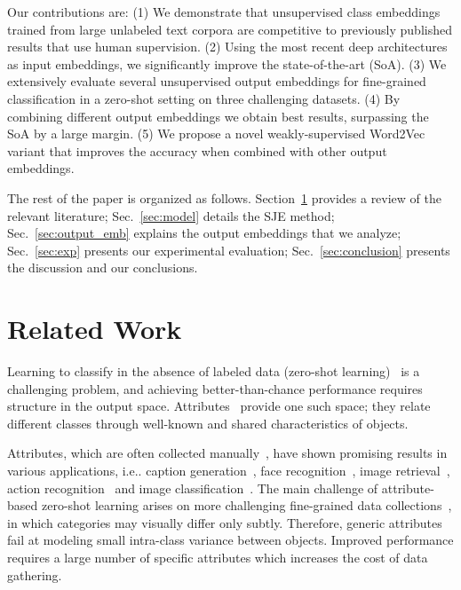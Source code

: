 \documentclass[10pt,twocolumn,letterpaper]{article}
\makeatletter
\newcommand{\SJE}{SJE\xspace}
\DeclareRobustCommand\onedot{\futurelet\@let@token\@onedot}
\def\@onedot{\ifx\@let@token.\else.\null\fi\xspace}
\def\ie{{i.e}\onedot} \def\Ie{{I.e}\onedot}
\makeatother
\begin{document}
Our contributions are: (1) We demonstrate that unsupervised class embeddings trained from large unlabeled text corpora are competitive to previously published results that use human supervision. (2) Using the most recent deep architectures as input embeddings, we significantly improve the state-of-the-art (SoA). (3) We extensively evaluate several unsupervised output embeddings for fine-grained classification in a zero-shot setting on three challenging datasets. (4) 
By combining different output embeddings we obtain best results, surpassing the SoA by a large margin. 
(5) We propose a novel weakly-supervised Word2Vec variant that improves the accuracy when combined with other output embeddings.  

The rest of the paper is organized as follows. Section~\ref{sec:prev} provides a review of the relevant literature; Sec.~\ref{sec:model} details the \SJE method; Sec.~\ref{sec:output_emb} explains the output embeddings that we analyze; Sec.~\ref{sec:exp} presents our experimental evaluation; Sec.~\ref{sec:conclusion} presents the discussion and our conclusions.





\section{Related Work }
\label{sec:prev}
Learning to classify in the absence of labeled data (zero-shot learning)~\cite{YA10,RSS11,KKTH12,LNH13,APHS15,NMBSSFCD13,MGS14, FHXFG14} is a challenging problem, and achieving better-than-chance performance requires structure in the output space.
Attributes~\cite{FZ07, FEH10, LNH13} provide one such space; they relate different classes through well-known and shared characteristics of objects. 


Attributes, which are often collected manually~\cite{KKTH12, PG11, DPCG12}, have shown promising results in various applications, \ie caption generation~\cite{KPD11,OKB11}, face recognition~\cite{SKBB12,CGG13}, image retrieval~\cite{SFD11,DRS11}, action recognition~\cite{LKS11,YJKLGL11} and image classification~\cite{LNH13, APHS15}.
The main challenge of attribute-based zero-shot learning arises on more challenging fine-grained data collections~\cite{CaltechUCSDBirdsDataset, StanfordDogsDataset}, in which categories may visually differ only subtly.
Therefore, generic attributes fail at modeling small intra-class variance between objects. Improved performance requires a large number of specific attributes which increases the cost of data gathering.
\end{document}
